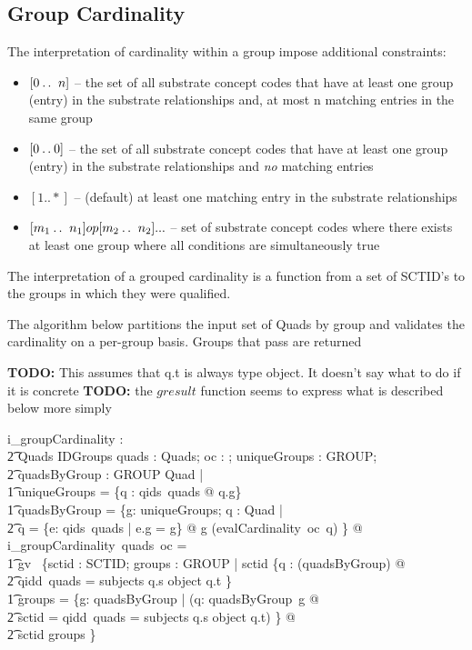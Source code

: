 \documentclass{article}
\begin{document}
\subsection{Group Cardinality}
The interpretation of cardinality within a group impose additional constraints:
\begin{itemize}[noitemsep,nolistsep]
\item{$[0\mathbin{\ldotp\ldotp}~n]$} -- the set of all substrate concept codes that have at least one group (entry) in the substrate relationships and,
at most n matching entries in the same group
\item{$[0\mathbin{\ldotp\ldotp}0]$} -- the set of all substrate concept codes that have at least one group (entry) in the substrate relationships and \emph{no} matching entries 
\item{$[1..*]$} -- (default) at least one matching entry in the substrate relationships
\item{$[m_1\mathbin{\ldotp\ldotp}~n_1] op [m_2\mathbin{\ldotp\ldotp}~n_2] ... $} -- set of substrate concept codes where there exists at least one group where all conditions are simultaneously true
\end{itemize}

The interpretation of a grouped cardinality is a function from a set of SCTID's to the groups in which they were qualified.

The algorithm below partitions the input set of Quads by group and validates the cardinality on a per-group basis.  Groups that
pass are returned

\textbf{TODO:} This assumes that q.t is always type object. It doesn't say what to do if it is concrete
\textbf{TODO:} the $gresult$ function seems to express what is described below more simply
\begin{gendef}
   i\_groupCardinality : \\
\t2 Quads \fun \optional[cardinality] \fun IDGroups
\where
   \forall quads : Quads; oc : \optional[cardinality]; uniqueGroups : \power GROUP; \\
\t2 quadsByGroup : GROUP \pfun \power Quad |  \\
\t1    uniqueGroups = \{q : qids~quads @ q.g\}  \land \\
\t1    quadsByGroup = \{g: uniqueGroups; q : \power Quad | \\
\t2 q = \{e: qids~quads | e.g = g\}  @ g \mapsto (evalCardinality~oc~q) \} @ \\
i\_groupCardinality~quads~oc = \\
\t1 gv~ \{sctid : SCTID; groups : \power GROUP | sctid \in \{q : \bigcup (\ran quadsByGroup) @ \\
\t2  \IF qidd~quads = subjects \THEN q.s \ELSE object \inv q.t \} \land \\
\t1 groups = \{g: \dom quadsByGroup | (\exists q: quadsByGroup~g @ \\
\t2 sctid = \IF qidd~quads = subjects \THEN q.s \ELSE object \inv q.t) \} @ \\
\t2 sctid \mapsto groups \}
\end{gendef}
\end{document}
